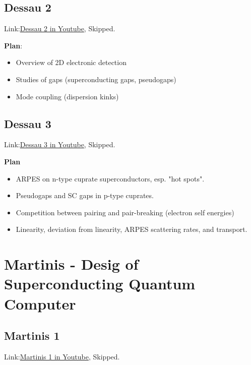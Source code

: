 \documentclass{article}
\begin{document}
    \subsection{Dessau 2}
    \label{sec:Dessau 2}
    Link:\href{https://www.youtube.com/watch?v=z0_ncvUxxrg&list=PL8mMEmoXNBfajJ15HO5G-PZW_0yWGWBdh&index=3}{Dessau 2 in Youtube}, Skipped.

    \textbf{Plan}:
    \begin{itemize}
        \item Overview of 2D electronic detection
        \item Studies of gaps (superconducting gaps, pseudogaps)
        \item Mode coupling (dispersion kinks)
    \end{itemize}

    \subsection{Dessau 3}
    \label{sec:Dessau 3}
    Link:\href{https://www.youtube.com/watch?v=DuQLBEBK7SM&list=PL8mMEmoXNBfajJ15HO5G-PZW_0yWGWBdh&index=4}{Dessau 3 in Youtube}, Skipped.

    \textbf{Plan}
    \begin{itemize}
        \item ARPES on n-type cuprate superconductors, esp. "hot spots".
        \item Pseudogaps and SC gaps in p-type cuprates.
        \item Competition between pairing and pair-breaking (electron
            self energies)
        \item Linearity, deviation from linearity, ARPES scattering rates,
            and transport.
    \end{itemize}
    {}
    

    \printnomenclature

\section{Martinis - Desig of Superconducting Quantum Computer}
\label{sec:Martinis - Desig of Superconducting Quantum Computer}

    \subsection{Martinis 1}
    \label{sec:Martinis 1}
    Link:\href{https://www.youtube.com/watch?v=CyeIeciAMDU&index=5&list=PL8mMEmoXNBfajJ15HO5G-PZW_0yWGWBdh}{Martinis 1 in Youtube}, Skipped.
    
\end{document}
